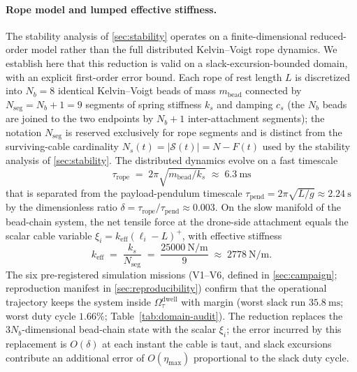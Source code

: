 \paragraph{Rope model and lumped effective stiffness.} The stability analysis of \cref{sec:stability} operates on a finite-dimensional reduced-order model rather than the full distributed Kelvin--Voigt rope dynamics. We establish here that this reduction is valid on a slack-excursion-bounded domain, with an explicit first-order error bound. Each rope of rest length $L$ is discretized into $N_b = 8$ identical Kelvin--Voigt beads of mass $m_{\mathrm{bead}}$ connected by $N_{\mathrm{seg}} = N_b + 1 = 9$ segments of spring stiffness $k_s$ and damping $c_s$ (the $N_b$ beads are joined to the two endpoints by $N_b{+}1$ inter-attachment segments); the notation $N_{\mathrm{seg}}$ is reserved exclusively for rope segments and is distinct from the surviving-cable cardinality $N_s(t) = |\mathcal{S}(t)| = N - F(t)$ used by the stability analysis of \cref{sec:stability}. The distributed dynamics evolve on a fast timescale
\begin{equation}
  \tau_{\mathrm{rope}}
    \;=\; 2\pi\sqrt{m_{\mathrm{bead}}/k_s}
    \;\approx\; \SI{6.3}{\milli\second}
  \label{eq:tau-rope}
\end{equation}
that is separated from the payload-pendulum timescale $\tau_{\mathrm{pend}} = 2\pi\sqrt{L/g} \approx \SI{2.24}{\second}$ by the dimensionless ratio $\delta = \tau_{\mathrm{rope}} / \tau_{\mathrm{pend}} \approx 0.003$. On the slow manifold of the bead-chain system, the net tensile force at the drone-side attachment equals the scalar cable variable $\xi_i = k_{\mathrm{eff}}(\ell_i - L)^+$, with effective stiffness
\begin{equation}
 k_{\mathrm{eff}}
    \;=\; \frac{k_s}{N_{\mathrm{seg}}}
    \;=\; \frac{\SI{25000}{\newton\per\metre}}{9}
    \;\approx\; \SI{2778}{\newton\per\metre}.
  \label{eq:keff}
\end{equation}
The six pre-registered simulation missions (V1--V6, defined in \cref{sec:campaign}; reproduction manifest in \cref{sec:reproducibility}) confirm that the operational trajectory keeps the system inside $\Omega_\tau^{\mathrm{dwell}}$ with margin (worst slack run $\SI{35.8}{\milli\second}$; worst duty cycle $1.66\%$; Table~\ref{tab:domain-audit}). The reduction replaces the $3N_b$-dimensional bead-chain state with the scalar $\xi_i$; the error incurred by this replacement is $O(\delta)$ at each instant the cable is taut, and slack excursions contribute an additional error of $O(\eta_{\max})$ proportional to the slack duty cycle.

